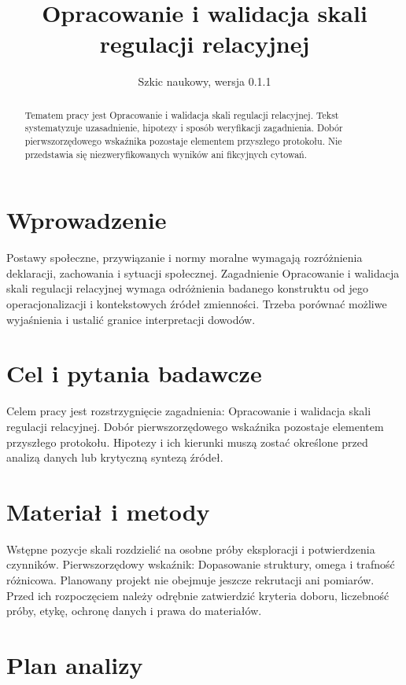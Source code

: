 \documentclass[11pt,a4paper]{article}
\title{Opracowanie i walidacja skali regulacji relacyjnej}
\author{}
\date{Szkic naukowy, wersja 0.1.1}
\begin{document}
\maketitle

\begin{abstract}

Tematem pracy jest Opracowanie i walidacja skali regulacji relacyjnej. Tekst systematyzuje uzasadnienie, hipotezy i sposób weryfikacji zagadnienia. Dobór pierwszorzędowego wskaźnika pozostaje elementem przyszłego protokołu. Nie przedstawia się niezweryfikowanych wyników ani fikcyjnych cytowań.

\end{abstract}

\section{Wprowadzenie}

Postawy społeczne, przywiązanie i normy moralne wymagają rozróżnienia deklaracji, zachowania i sytuacji społecznej. Zagadnienie Opracowanie i walidacja skali regulacji relacyjnej wymaga odróżnienia badanego konstruktu od jego operacjonalizacji i kontekstowych źródeł zmienności. Trzeba porównać możliwe wyjaśnienia i ustalić granice interpretacji dowodów.

\section{Cel i pytania badawcze}

Celem pracy jest rozstrzygnięcie zagadnienia: Opracowanie i walidacja skali regulacji relacyjnej. Dobór pierwszorzędowego wskaźnika pozostaje elementem przyszłego protokołu. Hipotezy i ich kierunki muszą zostać określone przed analizą danych lub krytyczną syntezą źródeł.

\section{Materiał i metody}

Wstępne pozycje skali rozdzielić na osobne próby eksploracji i potwierdzenia czynników. Pierwszorzędowy wskaźnik: Dopasowanie struktury, omega i trafność różnicowa. Planowany projekt nie obejmuje jeszcze rekrutacji ani pomiarów. Przed ich rozpoczęciem należy odrębnie zatwierdzić kryteria doboru, liczebność próby, etykę, ochronę danych i prawa do materiałów.

\section{Plan analizy}
\end{document}
